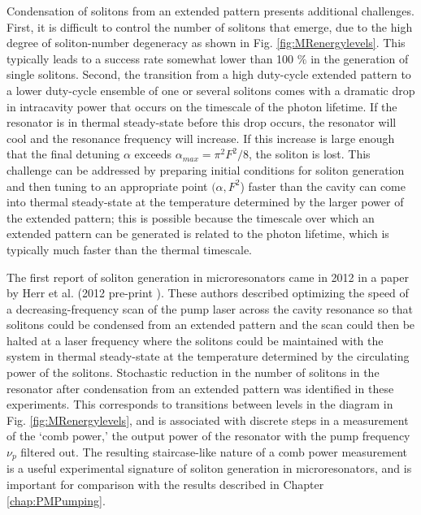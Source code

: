 Condensation of solitons from an extended pattern presents additional challenges. First, it is difficult to control the number of solitons that emerge, due to the high degree of soliton-number degeneracy as shown in Fig. \ref{fig:MRenergylevels}. This typically leads to a success rate somewhat lower than 100 $\%$ in the generation of single solitons. Second, the transition from a high duty-cycle extended pattern to a lower duty-cycle ensemble of one or several solitons comes with a dramatic drop in intracavity power that occurs on the timescale of the photon lifetime. If the resonator is in thermal steady-state before this drop occurs, the resonator will cool and the resonance frequency will increase. If this increase is large enough that the final detuning $\alpha$ exceeds $\alpha_{max}=\pi^2 F^2/8$, the soliton is lost. This challenge can be addressed by preparing initial conditions for soliton generation and then tuning to an appropriate point $(\alpha,F^2$) faster than the cavity can come into thermal steady-state at the temperature determined by the larger power of the extended pattern; this is possible because the timescale over which an extended pattern can be generated is related to the photon lifetime, which is typically much faster than the thermal timescale.

The first report of soliton generation in microresonators came in 2012 in a paper by Herr et al. \cite{Herr2014} (2012 pre-print \cite{Herr2012a}). These authors described optimizing the speed of a decreasing-frequency scan of the pump laser across the cavity resonance so that solitons could be condensed from an extended pattern and the scan could then be halted at a laser frequency where the solitons could be maintained with the system in thermal steady-state at the temperature determined by the circulating power of the solitons. Stochastic reduction in the number of solitons in the resonator after condensation from an extended pattern was identified in these experiments. This corresponds to transitions between levels in the diagram in Fig. \ref{fig:MRenergylevels}, and is associated with discrete steps in a measurement of the `comb power,' the output power of the resonator with the pump frequency $\nu_p$ filtered out. The resulting staircase-like nature of a comb power measurement is a useful experimental signature of soliton generation in microresonators, and is important for comparison with the results described in Chapter \ref{chap:PMPumping}.


